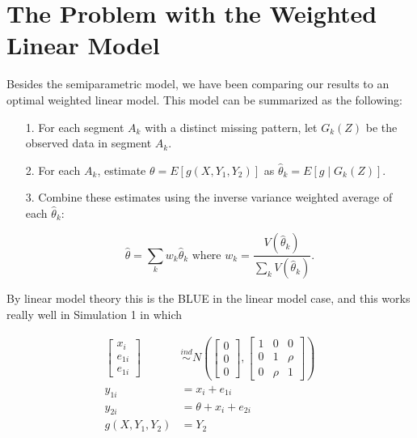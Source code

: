 \documentclass[12pt]{article}
\begin{document}
\rhead{\today}

\section*{The Problem with the Weighted Linear Model}

Besides the semiparametric model, we have been comparing our results to an 
optimal weighted linear model. This model can be summarized as the following:

\begin{itemize}
  \item[1.] For each segment $A_k$ with a distinct missing pattern, let 
    $G_k(Z)$ be the observed data in segment $A_k$.
  \item[2.] For each $A_k$, estimate $\theta = E[g(X, Y_1, Y_2)]$ as 
    $\hat \theta_k = E[g \mid G_k(Z)]$.
  \item[3.] Combine these estimates using the inverse variance weighted average
    of each $\hat \theta_k$:

    \[\hat \theta = \sum_{k} w_k \hat \theta_k \text{ where } 
      w_k = \frac{V(\hat \theta_k)}{\sum_k V(\hat \theta_k)}.\]
\end{itemize}

By linear model theory this is the BLUE in the linear model case, and
this works really well in Simulation 1 in which 

\begin{align*}
  \begin{bmatrix} x_i \\ e_{1i} \\ e_{1i} \end{bmatrix} 
  &\stackrel{ind}{\sim} N\left(
  \begin{bmatrix} 0 \\ 0 \\ 0 \end{bmatrix},
  \begin{bmatrix} 1 & 0 & 0 \\ 0 & 1 & \rho \\ 0 & \rho & 1 \end{bmatrix}
  \right)\\
  y_{1i} &= x_i + e_{1i} \\
  y_{2i} &= \theta + x_i + e_{2i} \\
  g(X, Y_1, Y_2) &= Y_2
\end{align*}
\end{document}
